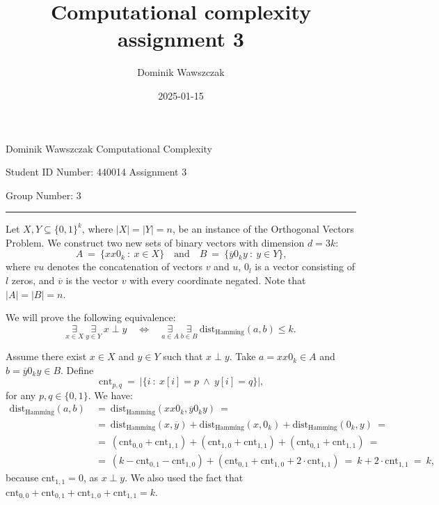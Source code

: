 \documentclass[12pt]{article}
\title{Computational complexity assignment 3}
\author{Dominik Wawszczak}
\date{2025-01-15}
\begin{document}
	\setlength{\parindent}{0 cm}
	
	Dominik Wawszczak \hfill Computational Complexity
	
	Student ID Number: 440014 \hfill Assignment 3
	
	Group Number: 3
	
	\bigskip
	\hrule
	\bigskip
	
	Let \(X, Y \subseteq \{0, 1\}^{k}\), where \(|X| = |Y| = n\), be an instance
	of the Orthogonal Vectors Problem. We construct two new sets of binary
	vectors with dimension \(d = 3k\):
	\[ A \ = \ \{xx0_{k} \ : \ x \in X\} \quad \text{and} \quad B \ = \
	\{\overline{y}0_{k}y \ : \ y \in Y\} \text{,} \]
	where \(vu\) denotes the concatenation of vectors \(v\) and \(u\), \(0_{l}\)
	is a vector consisting of \(l\) zeros, and \(\overline{v}\) is the vector
	\(v\) with every coordinate negated. Note that \(|A| = |B| = n\).
	
	\medskip
	
	We will prove the following equivalence:
	\begin{equation}
		\underset{x \in X}{\exists} \ \underset{y \in Y}{\exists} \ x \perp y
		\quad \iff \quad \underset{a \in A}{\exists} \
		\underset{b \in B}{\exists} \ \text{dist}_{\text{Hamming}}(a, b)
		\leqslant k \text{.} \label{eq:1}
	\end{equation}
	
	\medskip
	
	Assume there exist \(x \in X\) and \(y \in Y\) such that \(x \perp y\). Take
	\(a = xx0_{k} \in A\) and \(b = \overline{y}0_{k}y \in B\). Define
	\[ \text{cnt}_{p, q} \ = \ |\{i \ : \ x[i] = p \ \wedge \ y[i] = q\}|
	\text{,} \]
	for any \(p, q \in \{0, 1\}\). We have:
	\begin{align*}
		\text{dist}_{\text{Hamming}}(a, b) \ &= \
		\text{dist}_{\text{Hamming}}(xx0_{k}, \overline{y}0_{k}y) \ = \\
		&= \ \text{dist}_{\text{Hamming}}(x, \overline{y}) +
		\text{dist}_{\text{Hamming}}(x, 0_{k}) +
		\text{dist}_{\text{Hamming}}(0_{k}, y) \ = \\
		&= \ (\text{cnt}_{0, 0} + \text{cnt}_{1, 1}) + (\text{cnt}_{1, 0} +
		\text{cnt}_{1, 1}) + (\text{cnt}_{0, 1} + \text{cnt}_{1, 1}) \ = \\
		&= \ (k - \text{cnt}_{0, 1} - \text{cnt}_{1, 0}) + (\text{cnt}_{0, 1} +
		\text{cnt}_{1, 0} + 2 \cdot \text{cnt}_{1, 1}) \ = \ k + 2 \cdot
		\text{cnt}_{1, 1} \ = \ k \text{,}
	\end{align*}
	because \(\text{cnt}_{1, 1} = 0\), as \(x \perp y\). We also used the fact
	that \(\text{cnt}_{0, 0} + \text{cnt}_{0, 1} + \text{cnt}_{1, 0} +
	\text{cnt}_{1, 1} = k\).
	
\end{document}
